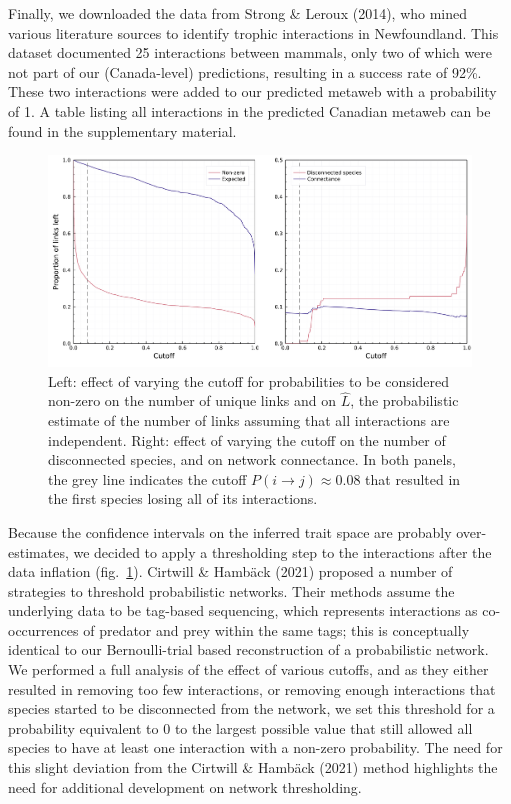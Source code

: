 \documentclass[10pt,oneside]{article}
\makeatletter
\def\maxwidth{\ifdim\Gin@nat@width>\linewidth\linewidth
\else\Gin@nat@width\fi}
\let\Oldincludegraphics\includegraphics
\renewcommand{\includegraphics}[1]{\Oldincludegraphics[width=\maxwidth]{#1}}
\makeatother
\begin{document}
Finally, we downloaded the data from Strong \& Leroux (2014), who mined
various literature sources to identify trophic interactions in
Newfoundland. This dataset documented 25 interactions between mammals,
only two of which were not part of our (Canada-level) predictions,
resulting in a success rate of 92\%. These two interactions were added
to our predicted metaweb with a probability of 1. A table listing all
interactions in the predicted Canadian metaweb can be found in the
supplementary material.

\begin{figure}
\hypertarget{fig:thresholds}{%
\centering
\includegraphics{figures/figure-cutoffs.png}
\caption{Left: effect of varying the cutoff for probabilities to be
considered non-zero on the number of unique links and on \(\hat{L}\),
the probabilistic estimate of the number of links assuming that all
interactions are independent. Right: effect of varying the cutoff on the
number of disconnected species, and on network connectance. In both
panels, the grey line indicates the cutoff
\(P(i\rightarrow j) \approx 0.08\) that resulted in the first species
losing all of its interactions.}\label{fig:thresholds}
}
\end{figure}

Because the confidence intervals on the inferred trait space are
probably over-estimates, we decided to apply a thresholding step to the
interactions after the data inflation (fig.~\ref{fig:thresholds}).
Cirtwill \& Hambäck (2021) proposed a number of strategies to threshold
probabilistic networks. Their methods assume the underlying data to be
tag-based sequencing, which represents interactions as co-occurrences of
predator and prey within the same tags; this is conceptually identical
to our Bernoulli-trial based reconstruction of a probabilistic network.
We performed a full analysis of the effect of various cutoffs, and as
they either resulted in removing too few interactions, or removing
enough interactions that species started to be disconnected from the
network, we set this threshold for a probability equivalent to 0 to the
largest possible value that still allowed all species to have at least
one interaction with a non-zero probability. The need for this slight
deviation from the Cirtwill \& Hambäck (2021) method highlights the need
for additional development on network thresholding.
\end{document}
